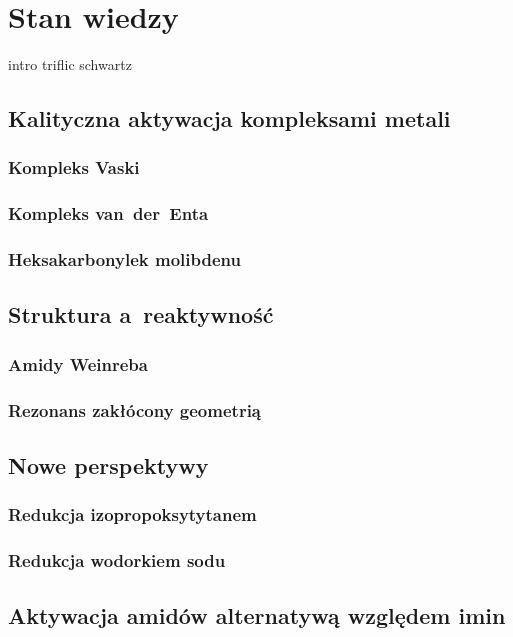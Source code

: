 \chapter{Stan wiedzy}

{intro}
{triflic}
{schwartz}

\section{Kalityczna aktywacja kompleksami metali}
\subsection{Kompleks Vaski}
\subsection{Kompleks van~der~Enta}
\subsection{Heksakarbonylek molibdenu}

\section{Struktura a~reaktywność}
\subsection{Amidy Weinreba}
\subsection{Rezonans zakłócony geometrią}

\section{Nowe perspektywy}
\subsection{Redukcja izopropoksytytanem}
\subsection{Redukcja wodorkiem sodu}

\section{Aktywacja amidów alternatywą względem imin}

